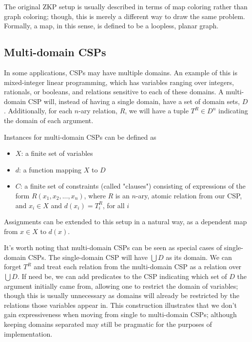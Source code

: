 \begin{remark}\label{remark:graph-map}
The original ZKP setup is usually described in terms of map coloring rather than graph coloring; though, this is merely a different way to draw the same problem. Formally, a map, in this sense, is defined to be a loopless, planar graph.
\end{remark}

\subsection{Multi-domain CSPs}\label{sec:multidomain}

In some applications, CSPs may have multiple domains. An example of this is mixed-integer linear programming, which has variables ranging over integers, rationals, or booleans, and relations sensitive to each of these domains. A multi-domain CSP will, instead of having a single domain, have a set of domain sets, $D$. Additionally, for each $n$-ary relation, $R$, we will have a tuple $T^R \in D^n$ indicating the domain of each argument.

Instances for multi-domain CSPs can be defined as

\begin{itemize}
  \item $X$: a finite set of variables
  \item $d$: a function mapping $X$ to $D$
  \item $C$: a finite set of constraints (called "clauses") consisting of expressions of the form $R(x_1,x_2,...,x_n)$, where $R$ is an $n$-ary, atomic relation from our CSP, and $x_i \in X$ and $d(x_i) = T^R_i$, for all $i$
\end{itemize}

Assignments can be extended to this setup in a natural way, as a dependent map from $x \in X$ to $d(x)$.

It’s worth noting that multi-domain CSPs can be seen as special cases of single-domain CSPs. The single-domain CSP will have $\bigcup D$ as its domain. We can forget $T^R$ and treat each relation from the multi-domain CSP as a relation over $\bigcup D$. If need be, we can add predicates to the CSP indicating which set of $D$ the argument initially came from, allowing one to restrict the domain of variables; though this is usually unnecessary as domains will already be restricted by the relations those variables appear in. This construction illustrates that we don’t gain expressiveness when moving from single to multi-domain CSPs; although keeping domains separated may still be pragmatic for the purposes of implementation.

